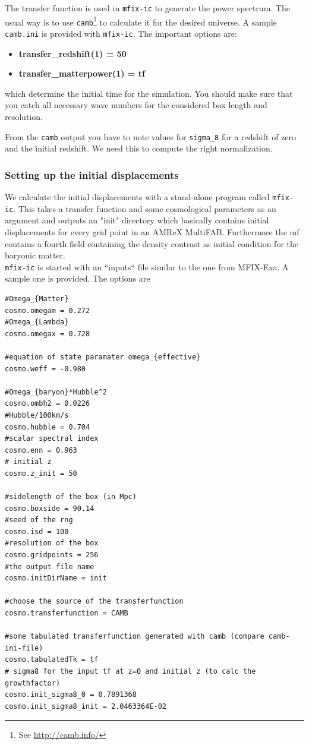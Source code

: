 	The transfer function is used in \texttt{mfix-ic} to generate the power
	spectrum. The usual way is to use \texttt{camb}\footnote{See \url{http://camb.info/}}
	to calculate it for the desired universe. A sample \texttt{camb.ini} is
	provided with \texttt{mfix-ic}. The important options are: 
	\begin{itemize}
		\item {\bf transfer\_redshift(1) = 50}
		\item {\bf transfer\_matterpower(1) = tf} 		
	\end{itemize}

	which determine the initial time for the simulation. You should make sure
	that you catch all necessary wave numbers for the considered box length and
	resolution.
	
	From the \texttt{camb} output you have to note values for \texttt{sigma\_8}
	for a redshift of zero and the initial redshift. We need this to compute
	the right normalization.
	
\subsubsection{Setting up the initial displacements}
	
	We calculate the initial displacements with a stand-alone program called
	\texttt{mfix-ic}. This takes a transfer function and some cosmological parameters
	as an argument and outputs an "init" directory which basically contains initial
	displacements for every grid point in an AMReX MultiFAB. Furthermore the mf 
	contains a fourth field containing the density contrast as initial condition
	for the baryonic matter. \\
	\texttt{mfix-ic} is started with an ``inputs``
	file similar to the one from MFIX-Exa. A sample one is provided. The options are
\begin{verbatim}
#Omega_{Matter}
cosmo.omegam = 0.272
#Omega_{Lambda}
cosmo.omegax = 0.728

#equation of state paramater omega_{effective}
cosmo.weff = -0.980

#Omega_{baryon}*Hubble^2 
cosmo.ombh2 = 0.0226
#Hubble/100km/s
cosmo.hubble = 0.704
#scalar spectral index
cosmo.enn = 0.963
# initial z
cosmo.z_init = 50

#sidelength of the box (in Mpc)
cosmo.boxside = 90.14
#seed of the rng
cosmo.isd = 100
#resolution of the box
cosmo.gridpoints = 256
#the output file name
cosmo.initDirName = init

#choose the source of the transferfunction
cosmo.transferfunction = CAMB

#some tabulated transferfunction generated with camb (compare camb-ini-file)
cosmo.tabulatedTk = tf
# sigma8 for the input tf at z=0 and initial z (to calc the growthfactor)
cosmo.init_sigma8_0 = 0.7891368
cosmo.init_sigma8_init = 2.0463364E-02
\end{verbatim} 


